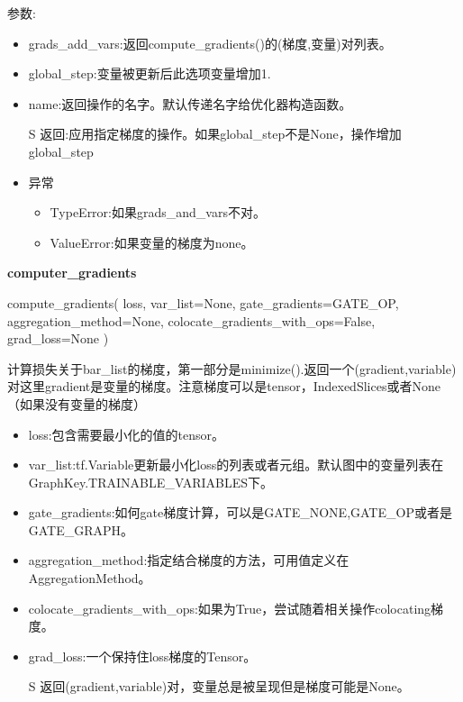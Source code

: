 参数:
\begin{itemize}
	\item grads\_add\_vars:返回compute\_gradients()的(梯度,变量)对列表。
	\item global\_step:变量被更新后此选项变量增加1.
	\item name:返回操作的名字。默认传递名字给优化器构造函数。
	\item [S] 返回:应用指定梯度的操作。如果global\_step不是None，操作增加global\_step
	\item 异常
	\begin{itemize}
		\item TypeError:如果grads\_and\_vars不对。
		\item ValueError:如果变量的梯度为none。
	\end{itemize}
\end{itemize}
\textbf{computer\_gradients}
\begin{python}
compute_gradients(
    loss,
    var_list=None,
    gate_gradients=GATE_OP,
    aggregation_method=None,
    colocate_gradients_with_ops=False,
    grad_loss=None
)
\end{python}
计算损失关于bar\_list的梯度，第一部分是minimize().返回一个(gradient,variable)对这里gradient是变量的梯度。注意梯度可以是tensor，IndexedSlices或者None（如果没有变量的梯度）
\begin{itemize}
	\item loss:包含需要最小化的值的tensor。
	\item var\_list:tf.Variable更新最小化loss的列表或者元组。默认图中的变量列表在GraphKey.TRAINABLE\_VARIABLES下。
	\item gate\_gradients:如何gate梯度计算，可以是GATE\_NONE,GATE\_OP或者是GATE\_GRAPH。
	\item aggregation\_method:指定结合梯度的方法，可用值定义在AggregationMethod。
	\item colocate\_gradients\_with\_ops:如果为True，尝试随着相关操作colocating梯度。
	\item grad\_loss:一个保持住loss梯度的Tensor。
	\item[S] 返回(gradient,variable)对，变量总是被呈现但是梯度可能是None。
\end{itemize}
